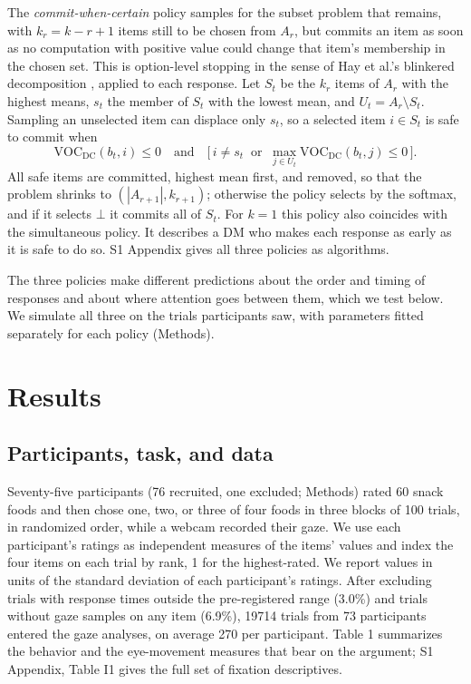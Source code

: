 \documentclass[10pt,letterpaper]{article}
\begin{document}
The \emph{commit-when-certain} policy samples for the subset problem
that remains, with \(k_r = k - r + 1\) items still to be chosen from
\(A_r\), but commits an item as soon as no computation with positive
value could change that item's membership in the chosen set. This is
option-level stopping in the sense of Hay et al.'s blinkered
decomposition \cite{hay2012}, applied to each response. Let \(S_t\) be
the \(k_r\) items of \(A_r\) with the highest means, \(s_t\) the member
of \(S_t\) with the lowest mean, and \(U_t = A_r \setminus S_t\).
Sampling an unselected item can displace only \(s_t\), so a selected
item \(i \in S_t\) is safe to commit when \begin{equation*}
\text{VOC}_{\text{DC}}(b_t, i) \le 0 \quad\text{and}\quad \Big[\, i \neq s_t \;\;\text{or}\;\; \max_{j \in U_t} \text{VOC}_{\text{DC}}(b_t, j) \le 0 \,\Big].
\end{equation*} All safe items are committed, highest mean first, and
removed, so that the problem shrinks to \((|A_{r+1}|, k_{r+1})\);
otherwise the policy selects by the softmax, and if it selects \(\bot\)
it commits all of \(S_t\). For \(k = 1\) this policy also coincides with
the simultaneous policy. It describes a DM who makes each response as
early as it is safe to do so. S1 Appendix gives all three policies as
algorithms.

The three policies make different predictions about the order and timing
of responses and about where attention goes between them, which we test
below. We simulate all three on the trials participants saw, with
parameters fitted separately for each policy (Methods).

\section*{Results}\label{results}

\subsection*{Participants, task, and
data}\label{participants-task-and-data}

Seventy-five participants (76 recruited, one excluded; Methods) rated 60
snack foods and then chose one, two, or three of four foods in three
blocks of 100 trials, in randomized order, while a webcam recorded their
gaze. We use each participant's ratings as independent measures of the
items' values and index the four items on each trial by rank, 1 for the
highest-rated. We report values in units of the standard deviation of
each participant's ratings. After excluding trials with response times
outside the pre-registered range (3.0\%) and trials without gaze samples
on any item (6.9\%), 19714 trials from 73 participants entered the gaze
analyses, on average 270 per participant. Table 1 summarizes the
behavior and the eye-movement measures that bear on the argument; S1
Appendix, Table I1 gives the full set of fixation descriptives.
\end{document}
